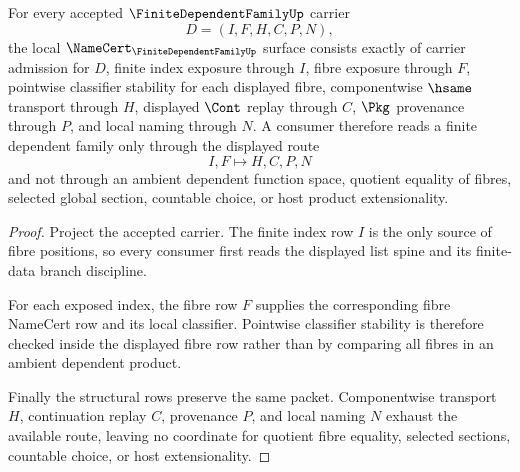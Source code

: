 \begin{theorem}
\label{thm:finite-dependent-family-namecert-obligations}
For every accepted $\FiniteDependentFamilyUp$ carrier
$$
D=(I,F,H,C,P,N),
$$
the local $\NameCert_{\FiniteDependentFamilyUp}$ surface consists exactly of carrier admission for $D$, finite index exposure through $I$, fibre exposure through $F$, pointwise classifier stability for each displayed fibre, componentwise $\hsame$ transport through $H$, displayed $\Cont$ replay through $C$, $\Pkg$ provenance through $P$, and local naming through $N$. A consumer therefore reads a finite dependent family only through the displayed route
$$
I,F \longmapsto H,C,P,N
$$
and not through an ambient dependent function space, quotient equality of fibres, selected global section, countable choice, or host product extensionality.
\end{theorem}
\begin{proof}
Project the accepted carrier. The finite index row $I$ is the only source of fibre positions, so every consumer first reads the displayed list spine and its finite-data branch discipline.

For each exposed index, the fibre row $F$ supplies the corresponding fibre NameCert row and its local classifier. Pointwise classifier stability is therefore checked inside the displayed fibre row rather than by comparing all fibres in an ambient dependent product.

Finally the structural rows preserve the same packet. Componentwise transport $H$, continuation replay $C$, provenance $P$, and local naming $N$ exhaust the available route, leaving no coordinate for quotient fibre equality, selected sections, countable choice, or host extensionality.
\end{proof}




